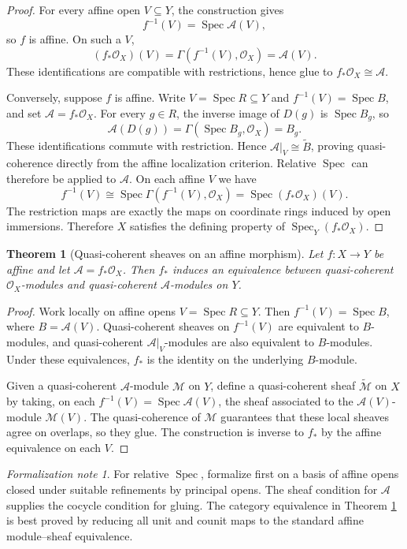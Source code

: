 \documentclass[11pt]{amsart}
\DeclareMathOperator{\Spec}{Spec}
\newcommand{\OO}{\mathcal O}
\newcommand{\A}{\mathscr A}
\theoremstyle{plain}
\newtheorem{theorem}{Theorem}[section]
\theoremstyle{definition}
\theoremstyle{remark}
\newtheorem*{formalization}{Formalization note}
\begin{document}
\begin{proof}
For every affine open $V\subseteq Y$, the construction gives
\[
  f^{-1}(V)=\Spec\A(V),
\]
so $f$ is affine.  On such a $V$,
\[
  (f_*\OO_X)(V)=\Gamma(f^{-1}(V),\OO_X)=\A(V).
\]
These identifications are compatible with restrictions, hence glue to $f_*\OO_X\cong \A$.

Conversely, suppose $f$ is affine. Write $V=\Spec R\subseteq Y$ and $f^{-1}(V)=\Spec B$, and set $\A=f_*\OO_X$. For every $g\in R$, the inverse image of $D(g)$ is $\Spec B_g$, so
\[
  \A(D(g))=\Gamma(\Spec B_g,\OO_X)=B_g.
\]
These identifications commute with restriction. Hence $\A|_V\cong\widetilde B$, proving quasi-coherence directly from the affine localization criterion. Relative $\Spec$ can therefore be applied to $\A$. On each affine $V$ we have
\[
  f^{-1}(V)
  \cong
  \Spec \Gamma(f^{-1}(V),\OO_X)
  =
  \Spec (f_*\OO_X)(V).
\]
The restriction maps are exactly the maps on coordinate rings induced by open immersions.  Therefore $X$ satisfies the defining property of $\Spec_Y(f_*\OO_X)$.
\end{proof}

\begin{theorem}[Quasi-coherent sheaves on an affine morphism]\label{thm:affine-qc-equivalence}
Let $f:X\to Y$ be affine and let $\A=f_*\OO_X$.  Then $f_*$ induces an equivalence between quasi-coherent $\OO_X$-modules and quasi-coherent $\A$-modules on $Y$.
\end{theorem}

\begin{proof}
Work locally on affine opens $V=\Spec R\subseteq Y$.  Then $f^{-1}(V)=\Spec B$, where $B=\A(V)$.  Quasi-coherent sheaves on $f^{-1}(V)$ are equivalent to $B$-modules, and quasi-coherent $\A|_V$-modules are also equivalent to $B$-modules.  Under these equivalences, $f_*$ is the identity on the underlying $B$-module.

Given a quasi-coherent $\A$-module $\mathscr M$ on $Y$, define a quasi-coherent sheaf $\widetilde{\mathscr M}$ on $X$ by taking, on each $f^{-1}(V)=\Spec\A(V)$, the sheaf associated to the $\A(V)$-module $\mathscr M(V)$.  The quasi-coherence of $\mathscr M$ guarantees that these local sheaves agree on overlaps, so they glue.  The construction is inverse to $f_*$ by the affine equivalence on each $V$.
\end{proof}

\begin{formalization}
For relative $\Spec$, formalize first on a basis of affine opens closed under suitable refinements by principal opens.  The sheaf condition for $\A$ supplies the cocycle condition for gluing.  The category equivalence in Theorem \ref{thm:affine-qc-equivalence} is best proved by reducing all unit and counit maps to the standard affine module--sheaf equivalence.
\end{formalization}
\end{document}
